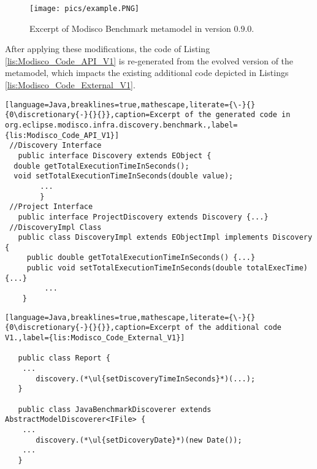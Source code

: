 \begin{comment}
    

\begin{itemize}
    \item \emph{1)} Renaming the property \texttt{DicoveryDate} of the class  \texttt{JavaBenchmarkDiscoverer} to \texttt{DiscoveryDate}. %
    
   \item \emph{2)} Moving the property \emph{discoveryTimeInSeconds} from metaclass \texttt{Discovery} to \texttt{DiscoveryIteration}. 
\end{itemize} %
\end{comment}

\begin{figure}

\centering
\texttt{[image: pics/example.PNG]}
\caption{Excerpt of Modisco Benchmark metamodel in version 0.9.0.}
\label{fig: BMM}
\end{figure}



After applying these modifications, the code of Listing \ref{lis:Modisco_Code_API_V1} is re-generated from the evolved version of the metamodel, which impacts the existing additional code depicted in Listings \ref{lis:Modisco_Code_External_V1}. 

\begin{lstlisting}[language=Java,breaklines=true,mathescape,literate={\-}{}{0\discretionary{-}{}{}},caption=Excerpt of the generated code in org.eclipse.modisco.infra.discovery.benchmark.,label={lis:Modisco_Code_API_V1}]
 //Discovery Interface
   public interface Discovery extends EObject {
  double getTotalExecutionTimeInSeconds();
  void setTotalExecutionTimeInSeconds(double value);
        ...
        }
 //Project Interface
   public interface ProjectDiscovery extends Discovery {...}
 //DiscoveryImpl Class
   public class DiscoveryImpl extends EObjectImpl implements Discovery {
     public double getTotalExecutionTimeInSeconds() {...}
     public void setTotalExecutionTimeInSeconds(double totalExecTime) {...}
         ...
    }
\end{lstlisting}
\begin{lstlisting}[language=Java,breaklines=true,mathescape,literate={\-}{}{0\discretionary{-}{}{}},caption=Excerpt of the additional code V1.,label={lis:Modisco_Code_External_V1}]
  
   public class Report {
    ...
       discovery.(*\ul{setDiscoveryTimeInSeconds}*)(...);
   }
    
   public class JavaBenchmarkDiscoverer extends AbstractModelDiscoverer<IFile> {
    ...
       discovery.(*\ul{setDicoveryDate}*)(new Date());
    ...
   } 
\end{lstlisting}


